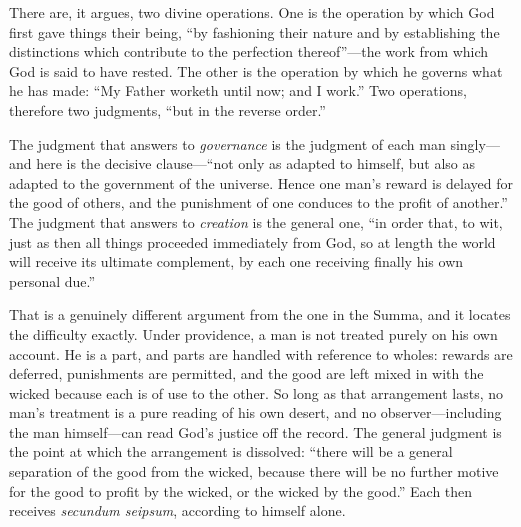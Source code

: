 There are, it argues, two divine operations. One is the operation by which God first gave things their being, ``by fashioning their nature and by establishing the distinctions which contribute to the perfection thereof''---the work from which God is said to have rested. The other is the operation by which he governs what he has made: ``My Father worketh until now; and I work.'' Two operations, therefore two judgments, ``but in the reverse order.''

The judgment that answers to \emph{governance} is the judgment of each man singly---and here is the decisive clause---``not only as adapted to himself, but also as adapted to the government of the universe. Hence one man's reward is delayed for the good of others, and the punishment of one conduces to the profit of another.'' The judgment that answers to \emph{creation} is the general one, ``in order that, to wit, just as then all things proceeded immediately from God, so at length the world will receive its ultimate complement, by each one receiving finally his own personal due.''

That is a genuinely different argument from the one in the Summa, and it locates the difficulty exactly. Under providence, a man is not treated purely on his own account. He is a part, and parts are handled with reference to wholes: rewards are deferred, punishments are permitted, and the good are left mixed in with the wicked because each is of use to the other. So long as that arrangement lasts, no man's treatment is a pure reading of his own desert, and no observer---including the man himself---can read God's justice off the record. The general judgment is the point at which the arrangement is dissolved: ``there will be a general separation of the good from the wicked, because there will be no further motive for the good to profit by the wicked, or the wicked by the good.'' Each then receives \emph{secundum seipsum}, according to himself alone.

